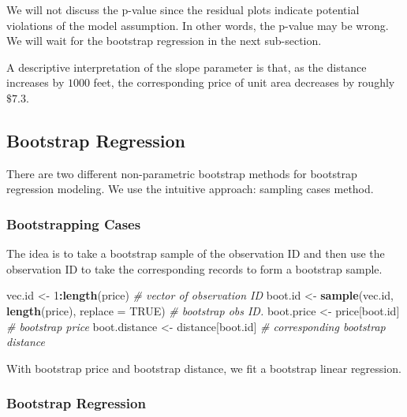 \documentclass[
]{book}
\newenvironment{Shaded}{\begin{snugshade}}{\end{snugshade}}
\newcommand{\AttributeTok}[1]{\textcolor[rgb]{0.13,0.29,0.53}{#1}}
\newcommand{\CommentTok}[1]{\textcolor[rgb]{0.56,0.35,0.01}{\textit{#1}}}
\newcommand{\ConstantTok}[1]{\textcolor[rgb]{0.56,0.35,0.01}{#1}}
\newcommand{\DecValTok}[1]{\textcolor[rgb]{0.00,0.00,0.81}{#1}}
\newcommand{\FunctionTok}[1]{\textcolor[rgb]{0.13,0.29,0.53}{\textbf{#1}}}
\newcommand{\NormalTok}[1]{#1}
\newcommand{\OtherTok}[1]{\textcolor[rgb]{0.56,0.35,0.01}{#1}}
\newcommand{\SpecialCharTok}[1]{\textcolor[rgb]{0.81,0.36,0.00}{\textbf{#1}}}
\begin{document}
We will not discuss the p-value since the residual plots indicate potential violations of the model assumption. In other words, the p-value may be wrong. We will wait for the bootstrap regression in the next sub-section.

A descriptive interpretation of the slope parameter is that, as the distance increases by \(1000\) feet, the corresponding price of unit area decreases by roughly \(\$7.3\).

\hypertarget{bootstrap-regression}{%
\subsection{Bootstrap Regression}\label{bootstrap-regression}}

There are two different non-parametric bootstrap methods for bootstrap regression modeling. We use the intuitive approach: sampling cases method.

\hypertarget{bootstrapping-cases}{%
\subsubsection{Bootstrapping Cases}\label{bootstrapping-cases}}

The idea is to take a bootstrap sample of the observation ID and then use the observation ID to take the corresponding records to form a bootstrap sample.

\begin{Shaded}
\begin{Highlighting}[]
\NormalTok{vec.id }\OtherTok{\textless{}{-}} \DecValTok{1}\SpecialCharTok{:}\FunctionTok{length}\NormalTok{(price)   }\CommentTok{\# vector of observation ID}
\NormalTok{boot.id }\OtherTok{\textless{}{-}} \FunctionTok{sample}\NormalTok{(vec.id, }\FunctionTok{length}\NormalTok{(price), }\AttributeTok{replace =} \ConstantTok{TRUE}\NormalTok{)   }\CommentTok{\# bootstrap obs ID.}
\NormalTok{boot.price }\OtherTok{\textless{}{-}}\NormalTok{ price[boot.id]           }\CommentTok{\# bootstrap price}
\NormalTok{boot.distance }\OtherTok{\textless{}{-}}\NormalTok{ distance[boot.id]     }\CommentTok{\# corresponding bootstrap distance}
\end{Highlighting}
\end{Shaded}

With bootstrap price and bootstrap distance, we fit a bootstrap linear regression.

\hypertarget{bootstrap-regression-1}{%
\subsubsection{Bootstrap Regression}\label{bootstrap-regression-1}}
\end{document}
